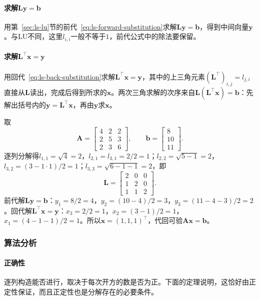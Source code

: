 \paragraph{求解$\bm L\bm y=\bm b$}
用第~\ref{sec:ls-lu}节的前代~\eqref{eq:ls-forward-substitution}求解$\bm L\bm y=\bm b$，得到中间向量$\bm y$。与LU不同，这里$l_{i,i}$一般不等于$1$，前代公式中的除法要保留。

\paragraph{求解$\bm L^\top\bm x=\bm y$}
用回代~\eqref{eq:ls-back-substitution}求解$\bm L^\top\bm x=\bm y$，其中的上三角元素$(\bm L^\top)_{i,j}=l_{j,i}$直接从$\bm L$读出，完成后得到所求的$\bm x$。两次三角求解的次序来自$\bm L(\bm L^\top\bm x)=\bm b$：先解出括号内的$\bm y=\bm L^\top\bm x$，再由$\bm y$求$\bm x$。

\begin{example}[Cholesky分解的三步计算]
\label{ex:ls-cholesky-three-steps}
取
\[
 \bm A=\begin{bmatrix}4&2&2\\2&5&3\\2&3&6\end{bmatrix},\qquad
 \bm b=\begin{bmatrix}8\\10\\11\end{bmatrix}.
\]
逐列分解得$l_{1,1}=\sqrt4=2$，$l_{2,1}=l_{3,1}=2/2=1$；$l_{2,2}=\sqrt{5-1}=2$，$l_{3,2}=(3-1\cdot1)/2=1$；$l_{3,3}=\sqrt{6-1-1}=2$，即
\[
 \bm L=\begin{bmatrix}2&0&0\\1&2&0\\1&1&2\end{bmatrix}.
\]
前代解$\bm L\bm y=\bm b$：$y_1=8/2=4$，$y_2=(10-4)/2=3$，$y_3=(11-4-3)/2=2$。回代解$\bm L^\top\bm x=\bm y$：$x_3=2/2=1$，$x_2=(3-1)/2=1$，$x_1=(4-1-1)/2=1$。所以$\bm x=(1,1,1)^\top$，代回可验$\bm A\bm x=\bm b$。
\end{example}

\subsubsection{算法分析}
\paragraph{正确性}
逐列构造能否进行，取决于每次开方的数是否为正。下面的定理说明，这恰好由正定性保证，而且正定性也是分解存在的必要条件。

